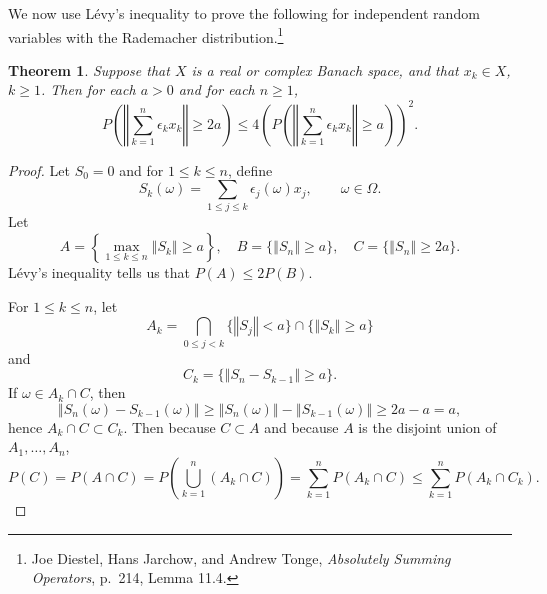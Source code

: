 \documentclass{article}
\newcommand{\norm}[1]{\left\Vert #1 \right\Vert}
\newtheorem{theorem}{Theorem}
\theoremstyle{definition}
\begin{document}
We now use L\'evy's inequality
to prove the following for independent random variables with the Rademacher
distribution.\footnote{Joe Diestel, Hans Jarchow, and Andrew Tonge, {\em Absolutely Summing Operators},
p.~214, Lemma 11.4.}


\begin{theorem}
Suppose that 
$X$ is a real or complex Banach space, and that
$x_k \in X$, $k \geq 1$.
Then for each $a>0$ and for each
$n \geq 1$,
\[
P\left( \norm{\sum_{k=1}^n \epsilon_k x_k} \geq 2a \right)
\leq 4\left(P\left( \norm{\sum_{k=1}^n \epsilon_k x_k} \geq a \right)\right)^2.
\]
\label{rademacher}
\end{theorem}
\begin{proof}
Let $S_0=0$ and for $1 \leq k \leq n$, define 
\[
S_k(\omega) = \sum_{1 \leq j \leq k} \epsilon_j(\omega) x_j, \qquad \omega \in \Omega.
\]
Let
\[
A = \left\{ \max_{1 \leq k \leq n} \norm{S_k} \geq a\right\},
\quad B = \{\norm{S_n} \geq a\}, \quad C=\{\norm{S_n} \geq 2a\}.
\]
L\'evy's inequality tells us that $P(A) \leq 2P(B)$.

For $1 \leq k \leq n$, let
\[
A_k = \bigcap_{0 \leq j < k} \{\norm{S_j} < a\} \cap \{\norm{S_k} \geq a\}
\]
and
\[
C_k = \{\norm{S_n-S_{k-1}} \geq a\}.
\]
If $\omega \in A_k \cap C$, then
\[
\norm{S_n(\omega)-S_{k-1}(\omega)} \geq \norm{S_n(\omega)} - \norm{S_{k-1}(\omega)}
\geq 2a - a = a,
\]
hence $A_k \cap C \subset C_k$. 
Then because $C \subset A$ and because $A$ is the disjoint union of $A_1,\ldots,A_n$,
\[
P(C)=P(A \cap C)
=P\left( \bigcup_{k=1}^n (A_k \cap C) \right)
=\sum_{k=1}^n P(A_k \cap C)
\leq \sum_{k=1}^n P(A_k \cap C_k).
\]


\end{proof}
\end{document}
